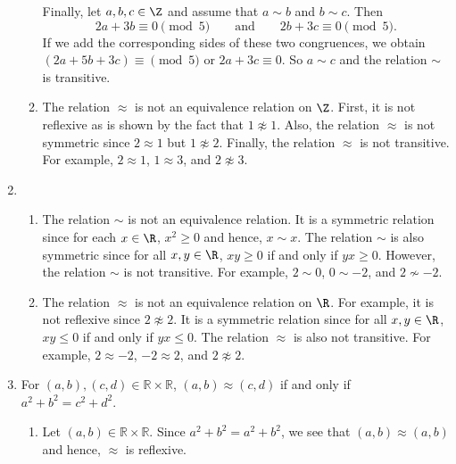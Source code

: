 \begin{enumerate}
\begin{enumerate}
Finally, let $a, b, c \in \Z$ and assume that $a \sim b$ and $b \sim c$.  Then
\[
2a + 3b \equiv 0 \pmod 5 \qquad \text{and} \qquad 2b + 3c \equiv 0 \pmod 5.
\]
If we add the corresponding sides of these two congruences, we obtain 
$(2a + 5b + 3c) \equiv \pmod 5$ or $2a + 3c \equiv 0$.  So $a \sim c$ and the relation $\sim$ is transitive.

\item The relation $\approx$ is not an equivalence relation on $\Z$.  First, it is not reflexive as is shown by the fact that $1 \not\approx 1$.  Also, the relation $\approx$ is not symmetric since $2 \approx 1$ but $1 \not\approx 2$.  Finally, the relation $\approx$ is not transitive.  For example, $2 \approx 1$, $1 \approx 3$, and $2 \not\approx 3$.
\end{enumerate}



\item \begin{enumerate}
\item The relation $\sim$ is not an equivalence relation.  It is a symmetric relation since for each $x \in \R$, $x^2 \geq 0$ and hence, $x \sim x$.  The relation $\sim$ is also symmetric since for all $x, y \in \R$, $xy \geq 0$ if and only if $yx \geq 0$.  However, the relation 
$\sim$ is not transitive.  For example, $2 \sim 0$, $0 \sim -2$, and $2 \not\sim -2$. 

\item The relation $\approx$ is not an equivalence relation on $\R$.  For example, it is not reflexive since $2 \not\approx 2$.  It is a symmetric relation since for all $x, y \in \R$, 
$xy \leq 0$ if and only if $yx \leq 0$.  The relation $\approx$ is also not transitive.  For example, $2 \approx -2$, $-2 \approx 2$, and $2 \not\approx 2$.
\end{enumerate}



\item For  $\left( {a, b} \right), \left( {c, d} \right) \in \mathbb{R} \times \mathbb{R}$,  $\left( {a, b} \right) \approx \left( {c, d} \right)$ if and only if  \\
$a^2  + b^2  = c^2  + d^2 $.

\begin{enumerate}
\item Let $\left( {a, b} \right) \in \mathbb{R} \times \mathbb{R}$.  Since 
$a^2 + b^2 = a^2 + b^2$, we see that $\left( {a, b} \right) \approx \left( {a, b} \right)$ and hence, $\approx$ is reflexive.


\end{enumerate}
\end{enumerate}
